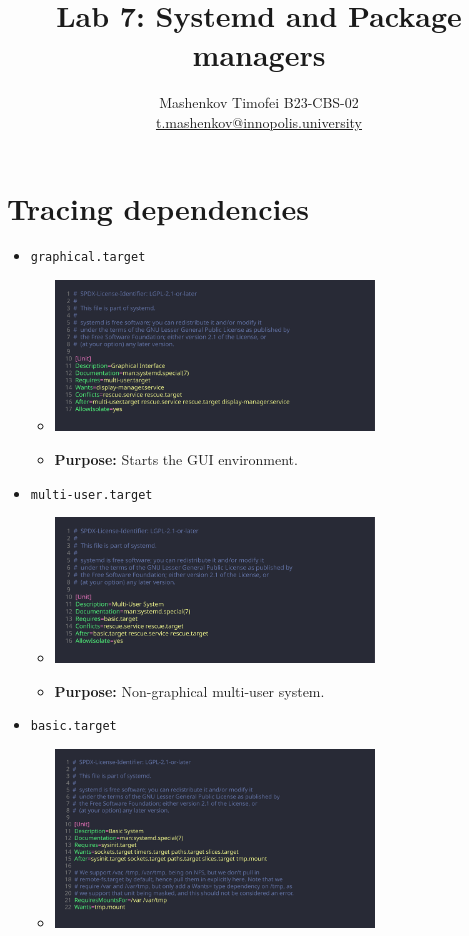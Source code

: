 \documentclass{article}
\title{Lab 7: Systemd and Package managers}
\author{Mashenkov Timofei B23-CBS-02 \\ \href{mailto:t.mashenkov@innopolis.university}{t.mashenkov@innopolis.university}}
\newcommand{\code}[1]{\colorbox{light-gray}{\texttt{#1}}}
\begin{document}
\maketitle{}

\section{Tracing dependencies}
\noindent

\begin{itemize}
	\item \code{graphical.target}
	      \begin{itemize}
		      \item \includegraphics[width=240pt]{7_1.jpg}
		      \item \textbf{Purpose:} Starts the GUI environment.
	      \end{itemize}
	\item \code{multi-user.target}
	      \begin{itemize}
		      \item \includegraphics[width=240pt]{7_2.png}
		      \item \textbf{Purpose:} Non-graphical multi-user system.
	      \end{itemize}
	\item \code{basic.target}
	      \begin{itemize}
		      \item \includegraphics[width=240pt]{7_3.png}

\end{itemize}
\end{itemize}
\end{document}
